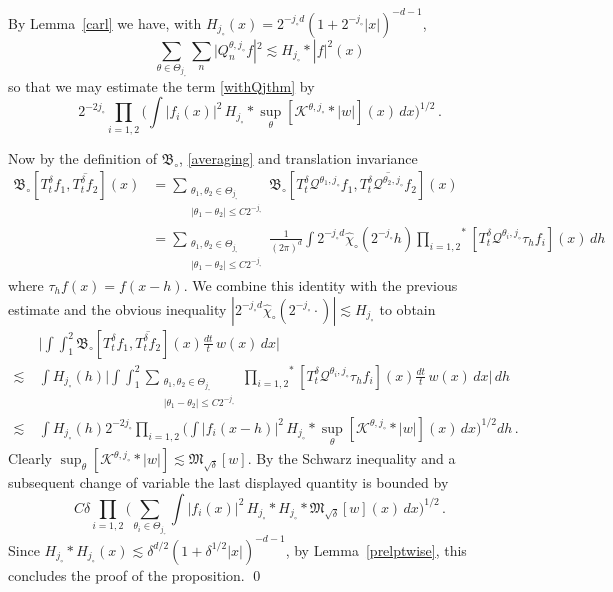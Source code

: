 \documentclass[11pt]{amsart}
\theoremstyle{definition}
\numberwithin{theorem}{section}
\numberwithin{definition}{section}
\def\prodstar{{\prod_{i=1,2}}^{\!\!*}}
\newcommand{\Be}{\begin{equation}}
\newcommand{\Ee}{\end{equation}}
\newcommand{\note}[1]{\footnote{\texttt{\Small #1}}}
\def\lc{\lesssim}
\def\fB{{\mathfrak {B}}}
\def\fM{{\mathfrak {M}}}
\def\cK{{\mathcal {K}}}
\def\cQ{{\mathcal {Q}}}
\begin{document}
By Lemma~\ref{carl} we have, with  $H_{j_\circ}(x)=2^{-j_\circ d}
(1+2^{-j_\circ}|x|)^{-d-1}$,
$$
\sum_{\theta\in\Theta_{j_\circ}}\sum_{n}
\big|Q^{\theta,j_{\circ}}_{n} f|^2 \lc H_{j_\circ}*|f|^2 (x)
$$
so that we may estimate
the term \eqref{withQjthm}
by
\Be
2^{-2j_\circ} \prod_{i=1,2}
\Big(\int
|f_i(x)|^2
\,H_{j_\circ} *\sup_{\theta}[
\cK^{\theta,j_{\circ}} *  |w|](x)\,dx\Big)^{1/2}\,.
\Ee

Now by the definition of $\fB_\circ$, \eqref{averaging}
and translation invariance
\begin{align*}\fB_\circ [T^\delta_t f_1,\overline{T^{\delta}_t f_2}](x)
&=\sum_{\substack{\theta_1, \theta_2\in\Theta_{j_\circ}\\ |\theta_1-\theta_2|\le C2^{-j_\circ}}}
\fB_\circ [T^\delta_t \cQ^{\theta_1,j_\circ}f_1,
\overline{T^{\delta}_t\cQ^{\theta_2,j_\circ} f_2}](x)
\\&=\sum_{\substack{\theta_1, \theta_2\in\Theta_{j_\circ}\\ |\theta_1-\theta_2|\le C2^{-j_\circ}}}
\frac{1}{(2\pi)^{d}}\int 2^{-j_\circ d}\widehat \chi_\circ (2^{-j_\circ}h)
\prodstar [T^\delta_t \cQ^{\theta_i,j_\circ}\tau_hf_i] (x)\, dh
\end{align*}
where $\tau_h f(x)=f(x-h)$.
We combine this identity  with the previous estimate
and the obvious inequality   $|2^{-j_\circ d}\widehat \chi_\circ (2^{-j_\circ}\cdot)|\lesssim H_{j_\circ}$
 to obtain
\begin{align*}
&\Big|\int \int_{1}^{2}
\fB_\circ [T^\delta_t f_1,\overline{T^{\delta}_t f_2}](x) \frac{dt}{t}\,
w(x)\,dx\Big|
\\ \lc\ & \int H_{j_\circ}(h)
\Big|\int \int_{1}^{2}\sum_{\substack{\theta_1, \theta_2\in\Theta_{j_\circ}\\ |\theta_1-\theta_2|\le C2^{-j_\circ}}}
\prodstar [T^\delta_t \cQ^{\theta_i,j_\circ}\tau_hf_i](x)
\frac{dt}{t}\,
w(x)\,dx\Big| \, dh
\\ \lc\ & \int H_{j_\circ}(h)
2^{-2j_\circ} \prod_{i=1,2}
\Big(\int
|f_i(x-h)|^2
\,H_{j_\circ} *\sup_{\theta}[\cK^{\theta,j_{\circ}}
*  |w|](x)\,dx\Big)^{1/2}
dh \,.
\end{align*}
 Clearly $\sup_{\theta}[\cK^{\theta,j_{\circ}} *|w|]\lc
\fM_{\sqrt\delta}[w].$
By the  Schwarz inequality and a subsequent
change of variable the last displayed quantity is bounded  by
$$
C\delta \prod_{i=1,2}
\Big(\sum_{\theta_i\in\Theta_{j_\circ}}\int
|f_i(x)|^2
\,H_{j_\circ}*H_{j_\circ} *\fM_{\sqrt\delta}[w](x)\,dx\Big)^{1/2}\,.
$$
Since $H_{j_\circ}*H_{j_\circ}(x)\lc \delta^{d/2}(1+\delta^{1/2}|x|)^{-d-1}$,
by Lemma~\ref{prelptwise},
  this concludes the proof of the proposition.
\qed
\end{document}
